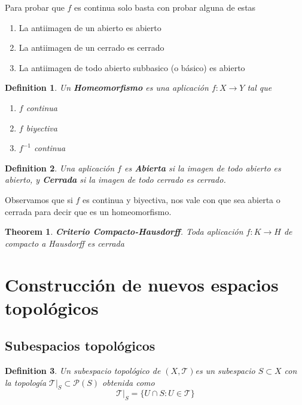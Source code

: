 \documentclass{myclass}
\newtheorem*{definition}{Definition}
\newtheorem*{theorem}{Theorem}
\begin{document}
Para probar que $f$ es continua solo basta con probar alguna de estas
 \begin{enumerate}[topsep=-6pt, itemsep=0pt]
  \item La antiimagen de un abierto es abierto
  \item La antiimagen de un cerrado es cerrado
	\item La antiimagen de todo abierto subbasico (o básico) es abierto
\end{enumerate}

\begin{definition}
Un \textbf{Homeomorfismo} es una aplicación $f: X \to Y$ tal que
\begin{enumerate}[topsep=-6pt, itemsep=0pt]
  \item $f$ continua
  \item  $f$ biyectiva
  \item  $f^{-1}$ continua
\end{enumerate}
\end{definition}

\begin{definition}
Una aplicación $f$ es \textbf{Abierta} si la imagen de todo abierto es abierto, y \textbf{Cerrada} si la imagen de todo cerrado es cerrado.
\end{definition}

Observamos que si $f$ es continua y biyectiva, nos vale con que sea abierta o cerrada para decir que es un homeomorfismo.

\begin{theorem}
\textbf{Criterio Compacto-Hausdorff}. Toda aplicación $f:K\to H$ de compacto a Hausdorff es cerrada
\end{theorem}


\section{Construcción de nuevos espacios topológicos}

\subsection{Subespacios topológicos}
\begin{definition}
Un subespacio topológico de $(X, \mathcal{T})$es un subespacio $S\subset X$ con la topología $\mathcal{T}|_S\subset \mathcal{P}(S)$ obtenida como
\[
\mathcal{T}|_S = \{U\cap S: U\in \mathcal{T}\}
\] 
\end{definition}
\end{document}
